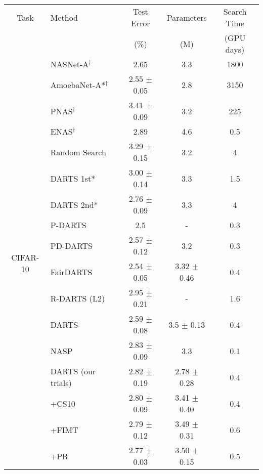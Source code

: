 \documentclass[letterpaper]{article} \usepackage{aaai22}  \usepackage{times}  \usepackage{helvet}  \usepackage{courier}  \usepackage[hyphens]{url}  \usepackage{graphicx} \urlstyle{rm} \def\UrlFont{\rm}  \usepackage{natbib}  \usepackage{caption} \DeclareCaptionStyle{ruled}{labelfont=normalfont,labelsep=colon,strut=off} \frenchspacing  \setlength{\pdfpagewidth}{8.5in}  \setlength{\pdfpageheight}{11in}  \usepackage{algorithm}
\begin{document}
\begin{table*}[t]
\centering \small
\begin{tabular}{@{}clccc@{}}
\toprule
Task & Method  &  Test Error \hspace{1mm} &  \hspace{1mm} Parameters \hspace{1mm} & \hspace{1mm} Search Time \\
 & &  (\%) \hspace{1mm} &  \hspace{1mm} (M) \hspace{1mm} & \hspace{1mm} (GPU days)
\\  \midrule
\multirow{23}{*}{CIFAR-10} & NASNet-A$^\dagger$ \cite{zoph2017neural} & 2.65 & 3.3 & 1800\\
& AmoebaNet-A*$^\dagger$  \cite{real2019regularized} &  2.55 $\pm$ 0.05  & 2.8 & 3150\\
& PNAS$^\dagger$  \cite{liu2018progressive} & 3.41 $\pm$ 0.09  & 3.2 & 225\\
& ENAS$^\dagger$  \cite{pham2018efficient} & 2.89 & 4.6 & 0.5\\ \cmidrule{2-5} 
& Random Search \cite{liu2018darts} & 3.29 $\pm$ 0.15  & 3.2 & 4\\
& DARTS 1st* \cite{liu2018darts} & 3.00 $\pm$ 0.14  & 3.3 & 1.5\\
& DARTS 2nd* \cite{liu2018darts} & 2.76 $\pm$ 0.09  & 3.3 & 4\\
& P-DARTS \cite{chen2019progressive} & 2.5 & - & 0.3\\
& PD-DARTS \cite{li2020pd} & 2.57 $\pm$ 0.12  & 3.2 & 0.3\\
& FairDARTS \cite{chu2020fair} & 2.54 $\pm$ 0.05 & 3.32 $\pm$ 0.46  & 0.4\\
& R-DARTS (L2) \cite{zela2020understanding} & 2.95 $\pm$ 0.21 & - & 1.6 \\
& DARTS- \cite{chu2020darts} & 2.59 $\pm$ 0.08  & 3.5 $\pm$ 0.13 & 0.4\\
& NASP \cite{yao2020efficient} & 2.83 $\pm$ 0.09 & 3.3 & 0.1\\ \cmidrule{2-5}
& DARTS (our trials) & 2.82 $\pm$ 0.19 & 2.78 $\pm$ 0.28 & 0.4 \\
& +CS10 & 2.80 $\pm$ 0.09 & 3.41 $\pm$ 0.40 & 0.4 \\
& +FIMT & 2.79 $\pm$ 0.12 & 3.49 $\pm$ 0.31 & 0.6 \\
& +PR & 2.77 $\pm$ 0.03 & 3.50 $\pm$ 0.15 & 0.5 \\

\end{tabular}
\end{table*}
\end{document}
